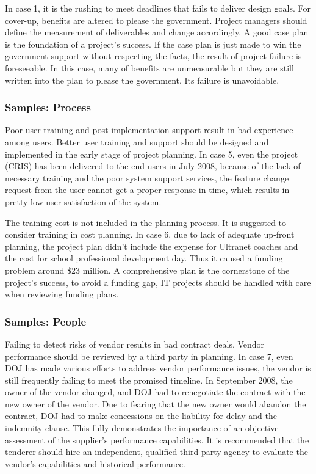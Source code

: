 In case 1, it is the rushing to meet deadlines that fails to deliver design goals. For cover-up, benefits are altered to please the government. Project managers should define the measurement of deliverables and change accordingly. A good case plan is the foundation of a project's success. If the case plan is just made to win the government support without respecting the facts, the result of project failure is foreseeable. In this case, many of benefits are unmeasurable but they are still written into the plan to please the government. Its failure is unavoidable.

\subsubsection{Samples: Process}
Poor user training and post-implementation support result in bad experience among users. Better user training and support should be designed and implemented in the early stage of project planning. In case 5, even the project (CRIS) has been delivered to the end-users in July 2008, because of the lack of necessary training and the poor system support services, the feature change request from the user cannot get a proper response in time, which results in pretty low user satisfaction of the system.

The training cost is not included in the planning process. It is suggested to consider training in cost planning. In case 6, due to lack of adequate up-front planning, the project plan didn't include the expense for Ultranet coaches and the cost for school professional development day. Thus it caused a funding problem around \$23 million. A comprehensive plan is the cornerstone of the project's success, to avoid a funding gap, IT projects should be handled with care when reviewing funding plans.

\subsubsection{Samples: People}
Failing to detect risks of vendor results in bad contract deals. Vendor performance should be reviewed by a third party in planning. In case 7, even DOJ has made various efforts to address vendor performance issues, the vendor is still frequently failing to meet the promised timeline. In September 2008, the owner of the vendor changed, and DOJ had to renegotiate the contract with the new owner of the vendor. Due to fearing that the new owner would abandon the contract, DOJ had to make concessions on the liability for delay and the indemnity clause. This fully demonstrates the importance of an objective assessment of the supplier's performance capabilities. It is recommended that the tenderer should hire an independent, qualified third-party agency to evaluate the vendor's capabilities and historical performance.


